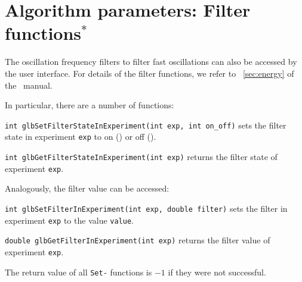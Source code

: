 \section{Algorithm parameters: Filter functions$^*$}

The oscillation frequency filters to filter fast oscillations
can also be accessed by the user interface. For details of
the filter functions, we refer to \Sec~\ref{sec:energy} of
the \AEDL\ manual.

In particular, there are a number of functions:
\begin{function}
{\tt int glbSetFilterStateInExperiment(int exp, int on\_off)} sets the filter state in experiment {\tt exp} to on () or off ().
\end{function}
\begin{function}
{\tt int glbGetFilterStateInExperiment(int exp)} returns the filter state of experiment {\tt exp}.
\end{function}
Analogously, the filter value can be accessed:
\begin{function}
{\tt int glbSetFilterInExperiment(int exp, double filter)} sets the filter  in experiment {\tt exp} to the value {\tt value}.
\end{function}
\begin{function}
{\tt double glbGetFilterInExperiment(int exp)} returns the filter value of experiment {\tt exp}.
\end{function}
The return value of all {\tt Set-} functions is $-1$ if they were not successful.

